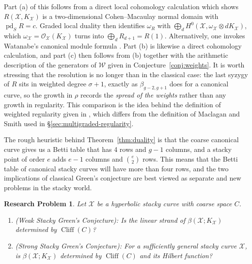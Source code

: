 \documentclass[11pt,reqno]{amsart}
\newtheorem{problem}[lemma]{Research Problem}
\theoremstyle{remark}
\newcommand{\pd}{\operatorname{pd}}
\newcommand{\cliff}{\operatorname{Cliff}}
\newcommand{\cO}{\mathcal{O}}
\newcommand{\cW}{\mathcal{W}}
\newcommand{\cX}{\mathcal{X}}
\begin{document}
Part (a) of this follows from a direct local cohomology calculation which shows $R(\cX,K_{\cX})$ is a two-dimensional Cohen--Macaulay normal domain with $\pd_SR=c$. Graded local duality then identifies $\omega_R$ with $\bigoplus_dH^0(\cX,\omega_{\cX}\otimes dK_{\cX})$, which $\omega_{\cX}=\cO_{\cX}(K_{\cX})$ turns into $\bigoplus_dR_{d+1}=R(1)$. Alternatively, one invokes Watanabe's canonical module formula \cite{watanabe81}. Part (b) is likewise a direct cohomology calculation, and part (c) then follows from (b) together with the arithmetic description of the generators of $\cW$ given in Conjecture~\ref{conj:weights}. It is worth stressing that the resolution is no longer than in the classical case: the last syzygy of $R$ sits in weighted degree $\sigma+1$, exactly as $\beta_{g-2,g+1}$ does for a canonical curve, so the growth in $\rho$ records the \emph{spread of the weights} rather than any growth in regularity. This comparison is the idea behind the definition of weighted regularity given in \cite{brownErman25,brownErmanStrands24}, which differs from the definition of Maclagan and Smith used in \S\ref{sec:multigraded-regularity}.

The rough heuristic behind Theorem~\ref{thm:duality} is that the coarse canonical curve gives us a Betti table that has 4 rows and $g-1$ columns, and a stacky point of order $e$ adds $e-1$ columns and $\binom{e}{2}$ rows. This means that the Betti table of canonical stacky curves will have more than four rows, and the two implications of classical Green's conjecture are best viewed as separate and new problems in the stacky world. 

\begin{problem}\label{prob:ws}
Let $\cX$ be a hyperbolic stacky curve with coarse space $C$.
\begin{enumerate}
\item (Weak Stacky Green's Conjecture):  Is the linear strand of $\beta(\cX;K_{\cX})$ determined by $\cliff(C)$?
\item (Strong Stacky Green's Conjecture): For a sufficiently general stacky curve $\cX$, is $\beta(\cX;K_{\cX})$ determined by $\cliff(C)$ and its Hilbert function?
\end{enumerate} 
\end{problem}
\end{document}

